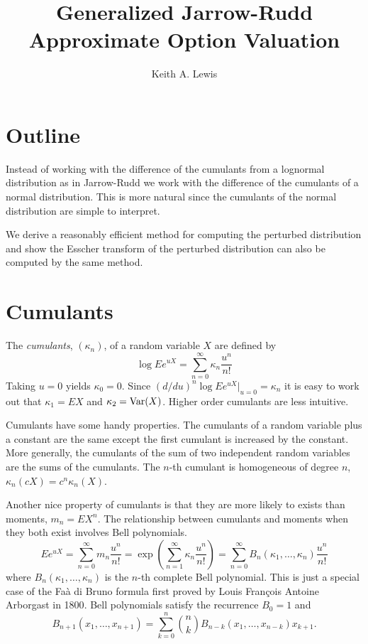 \documentclass[11pt]{article}
\title{Generalized Jarrow-Rudd Approximate Option Valuation}
\author{Keith A. Lewis}
\date{}
\newcommand{\Var}{\mathop{\rm{Var}}}
\begin{document}
\maketitle

\section{Outline}

Instead of working with the difference of the cumulants from a lognormal
distribution as in Jarrow-Rudd \cite{?} we work with the difference of
the cumulants of a 
normal distribution. This
is more natural since the cumulants of the normal distribution are
simple to interpret.

We derive a reasonably efficient method for computing the perturbed
distribution and show the Esscher transform of the perturbed distribution
can also be computed by the same method.

\section{Cumulants}

The {\em cumulants}, \((\kappa_n)\), of a random variable \(X\)
are defined by
\[
\log Ee^{uX} = \sum_{n=0}^\infty \kappa_n \frac{u^n}{n!}
\]
Taking \(u = 0\) yields \(\kappa_0 = 0\). Since
\((d/du)^n\log Ee^{uX}|_{u = 0} = \kappa_n\) it is easy to
work out that
\(\kappa_1 = EX\) and \(\kappa_2 = \Var(X)\). Higher order
cumulants are less intuitive.

Cumulants have some handy properties. 
The cumulants of a random variable plus a constant are the 
same except the first cumulant is increased by the constant.
More generally, the cumulants of the sum of two independent 
random variables are the sums of the cumulants.
The \(n\)-th cumulant is homogeneous of degree \(n\), 
\(\kappa_n(cX) = c^n\kappa_n(X)\).

Another nice property of cumulants is that they are more likely
to exists than moments, \(m_n = EX^n\).
The relationship between cumulants and moments when they both
exist involves Bell polynomials\cite{?}.
\[
Ee^{uX} = \sum_{n=0}^\infty m_n \frac{u^n}{n!}
 = \exp(\sum_{n=1}^\infty \kappa_n \frac{u^n}{n!})
= \sum_{n=0}^\infty B_n(\kappa_1,\dots,\kappa_n) \frac{u^n}{n!}
\]
where \(B_n(\kappa_1,\dots,\kappa_n)\) is the \(n\)-th complete
Bell polynomial.
This is just a special case of the
Fa\`a di Bruno formula first proved by Louis Fran\c{c}ois Antoine
Arborgast in 1800\cite{Arborgast}.
Bell polynomials satisfy the recurrence \cite{Comtet} \(B_0 = 1\) and
\[
B_{n+1}(x_1,\dots,x_{n+1}) = \sum_{k=0}^n \binom{n}{k}
B_{n - k}(x_1,\dots, x_{n - k}) x_{k+1}.
\]
\end{document}
